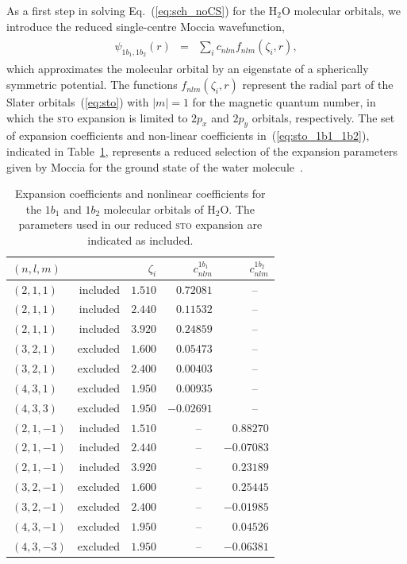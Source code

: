 As a first step in solving Eq.~(\ref{eq:sch_noCS}) for the H$_{2}$O
molecular orbitals, we introduce the reduced single-centre Moccia
wavefunction,
%
\begin{eqnarray}
  \begin{split}
    \psi_{1b_{1},1b_{2}}(r) & = & \sum\limits_{i} c_{nlm} f_{nlm}(\zeta_{i}, r),
    \label{eq:sto_1b1_1b2}
  \end{split}
\end{eqnarray}
%
which approximates the molecular orbital by an eigenstate of a
spherically symmetric potential. The functions $f_{nlm}(\zeta_{i},r)$
represent the radial part of the Slater orbitals~(\ref{eq:sto}) with
$|m|=1$ for the magnetic quantum number, in which the \textsc{sto}
expansion is limited to $2p_{x}$ and $2p_{y}$ orbitals,
respectively. The set of expansion coefficients and non-linear
coefficients in~(\ref{eq:sto_1b1_1b2}), indicated in
Table~\ref{tab:1b11b2_coef}, represents a reduced selection of the
expansion parameters given by Moccia for the ground state of the water
molecule~\cite{Moccia_1964}.

\begin{table}[t]
 \centering
  \caption{\label{tab:1b11b2_coef} Expansion coefficients and
    nonlinear coefficients for the $1b_{1}$ and $1b_{2}$ molecular
    orbitals of H$_{2}$O. The parameters used in our reduced
    \textsc{sto} expansion are indicated as included.}
  \begin{tabular}{lrrrr}
    \toprule
    $(n,l, m)$ & & $\zeta_{i}$ & $c_{nlm}^{1b_{1}}$ & $c_{nlm}^{1b_{2}}$ \\
    \midrule
    $(2,1,1)$ & included & $1.510$ & $0.72081$ & --~~ \\
    $(2,1,1)$ & included & $2.440$ & $0.11532$ & --~~ \\
    $(2,1,1)$ & included & $3.920$ & $0.24859$ & --~~ \\
    $(3,2,1)$ & excluded & $1.600$ & $0.05473$ & --~~ \\
    $(3,2,1)$ & excluded & $2.400$ & $0.00403$ & --~~ \\
    $(4,3,1)$ & excluded & $1.950$ & $0.00935$ & --~~ \\
    $(4,3,3)$ & excluded & $1.950$ & $-0.02691$ & --~~ \\
    $(2,1,-1)$ & included & $1.510$ & --~~ & $0.88270$ \\
    $(2,1,-1)$ & included & $2.440$ & --~~ & $-0.07083$ \\
    $(2,1,-1)$ & included & $3.920$ & --~~ & $0.23189$ \\
    $(3,2,-1)$ & excluded & $1.600$ & --~~ & $0.25445$ \\
    $(3,2,-1)$ & excluded & $2.400$ & --~~ & $-0.01985$ \\
    $(4,3,-1)$ & excluded & $1.950$ & --~~ & $0.04526$ \\
    $(4,3,-3)$ & excluded & $1.950$ & --~~ & $-0.06381$ \\
    \bottomrule
  \end{tabular}
\end{table}

